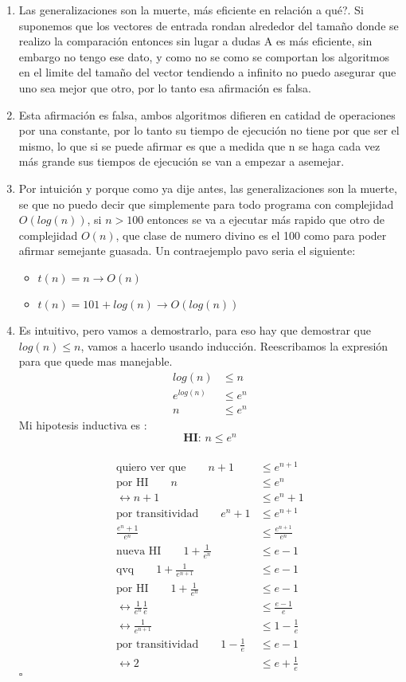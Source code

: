 \documentclass{article}
\begin{document}
\begin{enumerate}[label=\alph*)]
\item  Las generalizaciones son la muerte, más eficiente en relación a qué?.
 Si suponemos que los vectores de entrada rondan alrededor del tamaño donde se realizo la comparación
  entonces sin lugar a dudas A es más eficiente, sin embargo no tengo ese dato, y como no se como se comportan los algoritmos
   en el limite del tamaño del vector tendiendo a infinito no puedo asegurar que uno sea mejor que otro, por lo tanto esa afirmación es falsa.
\item Esta afirmación es falsa, ambos algoritmos difieren en catidad de operaciones por una constante, por lo tanto su tiempo de ejecución no tiene por que ser el mismo, lo que si se puede afirmar es que a medida que n se haga cada vez más grande sus tiempos de ejecución se van a empezar a asemejar.
\item Por intuición y porque como ya dije antes, las generalizaciones son la muerte, se que no puedo decir que simplemente para todo programa con complejidad $O(log(n))$, si $n>100$ entonces se va a ejecutar más rapido que otro de complejidad $O(n)$, que clase de numero divino es el 100 como para poder afirmar semejante guasada. Un contraejemplo pavo seria el siguiente:
\begin{itemize}
\item $t(n)= n \rightarrow O(n)$
\item $t(n)= 101+log(n) \rightarrow O(log(n))$
\end{itemize}
\item Es intuitivo, pero vamos a demostrarlo, para eso hay que demostrar que $log(n)\leq n$, vamos a hacerlo usando inducción. Reescribamos la expresión para que quede mas manejable.
\begin{align*}
log(n) &\leq n\\
e^{log(n)} &\leq e^n\\
n &\leq e^n
\end{align*}
Mi hipotesis inductiva es : $$\textbf{HI:\ }n \leq e^n$$ \\
\begin{align*}
\textrm{quiero ver que}\qquad n+1 &\leq e^{n+1}\\
\textrm{por HI}\qquad n &\leq e^n\\
\leftrightarrow n +1 &\leq e^n +1\\
\textrm{por transitividad}\qquad e^n +1 &\leq e^{n+1}\\
\frac{e^n +1}{e^n} &\leq \frac{e^{n+1}}{e^n}\\
\textrm{nueva HI}\qquad 1 +\frac{1}{e^n} &\leq e-1\\
\textrm{qvq}\qquad 1 +\frac{1}{e^{n+1}} &\leq e-1\\
\textrm{por HI}\qquad  1 +\frac{1}{e^n} &\leq e-1\\
\leftrightarrow \frac{1}{e^n}\frac{1}{e} &\leq \frac{e-1}{e} \\
\leftrightarrow \frac{1}{e^{n+1}} &\leq 1-\frac{1}{e} \\
\textrm{por transitividad}\qquad 1-\frac{1}{e}&\leq e-1\\
\leftrightarrow 2 &\leq e+\frac{1}{e} 
\end{align*}$\square$


\end{enumerate}
\end{document}
